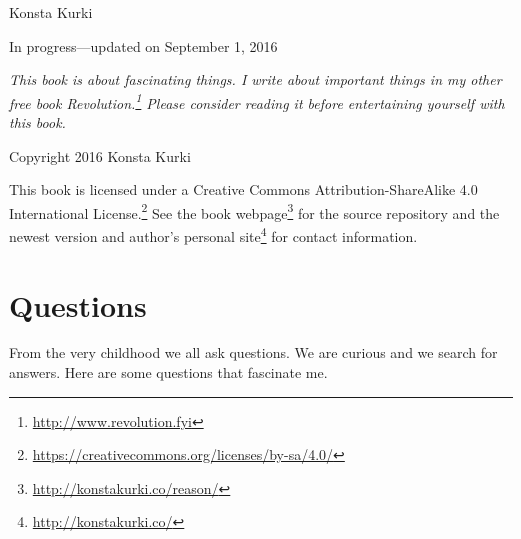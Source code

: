 \documentclass[11pt,oneside,%
]{memoir}
\theoremstyle{definition}
\begin{document}
\frontmatter

\thispagestyle{empty}


\vspace{0.3in}

\noindent Konsta Kurki

\vspace{0.3in}

\noindent In progress---updated on September 1, 2016

\vfill

\noindent\emph{This book is about fascinating things. I write about important things in my other free book \emph{Revolution}.\footnote{\url{http://www.revolution.fyi}} Please consider reading it before entertaining yourself with this book.}

\vfill

\noindent Copyright {\textcopyright} 2016 Konsta Kurki

\vspace{0.18in}

\noindent This book is licensed under a Creative Commons Attribution-ShareAlike 4.0 International License.\footnote{\url{https://creativecommons.org/licenses/by-sa/4.0/}} See the book webpage\footnote{\url{http://konstakurki.co/reason/}} for the source repository and the newest version and author's personal site\footnote{\url{http://konstakurki.co/}} for contact information.

\newpage

\mainmatter

\tableofcontents

\chapter{Questions}

From the very childhood we all ask questions. We are curious and we search for answers. Here are some questions that fascinate me.
\end{document}
